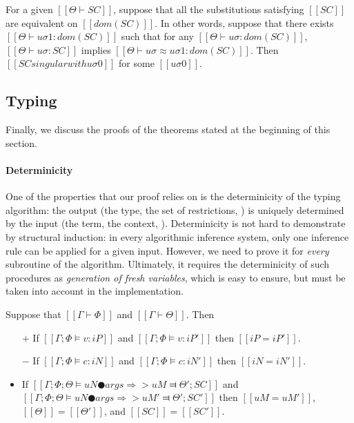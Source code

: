 \begin{lemma*}
    \label{lemma:singularity-completeness}
    For a given $[[Θ ⊢ SC]]$,
    suppose that all the substitutions satisfying $[[SC]]$ are equivalent
    on $[[dom(SC)]]$.
    In other words, suppose that there exists $[[Θ ⊢ uσ1 : dom(SC)]]$ such that
    for any $[[Θ ⊢ uσ : dom(SC)]]$, $[[Θ ⊢ uσ : SC]]$ implies 
    $[[Θ ⊢ uσ ≈ uσ1 : dom(SC)]]$.
    Then\footnotemark[1] $[[SC singular with uσ0]]$ for some $[[uσ0]]$.
\end{lemma*}

\subsection{Typing}

Finally, we discuss the proofs of the theorems stated at the beginning of this section.

\paragraph{Determinicity}
    One of the properties that our proof relies on is the determinicity of the 
    typing algorithm: the output (the type, the set of restrictions, \etc) 
    is uniquely determined by the input (the term, the context, \etc).
    Determinicity is not hard to demonstrate by structural induction: 
    in every algorithmic inference system, only one inference rule can be applied 
    for a given input.  However, we need to prove it for \emph{every} 
    subroutine of the algorithm. Ultimately, it requires 
    the determinicity of such procedures as \emph{generation of fresh variables}, 
    which is easy to ensure, but must be taken into account in the implementation.

\begin{lemma*}
    Suppose that $[[Γ ⊢ Φ]]$ and $[[Γ ⊢ Θ]]$. Then 
    \begin{itemize}
        \item [$+$] If $[[Γ; Φ ⊨ v : iP]]$ and $[[Γ; Φ ⊨ v : iP']]$ then $[[iP = iP']]$.
        \item [$-$] If $[[Γ; Φ ⊨ c : iN]]$ and $[[Γ; Φ ⊨ c : iN']]$ then $[[iN = iN']]$.
        \item If $[[Γ; Φ; Θ ⊨ uN ● args ⇒> uM ⫤ Θ'; SC]]$ and 
            $[[Γ; Φ; Θ ⊨ uN ● args ⇒> uM' ⫤ Θ'; SC']]$ then 
            $[[uM = uM']]$, $[[Θ]] = [[Θ']]$, and $[[SC]] =[[SC']]$.  
    \end{itemize}
\end{lemma*}

